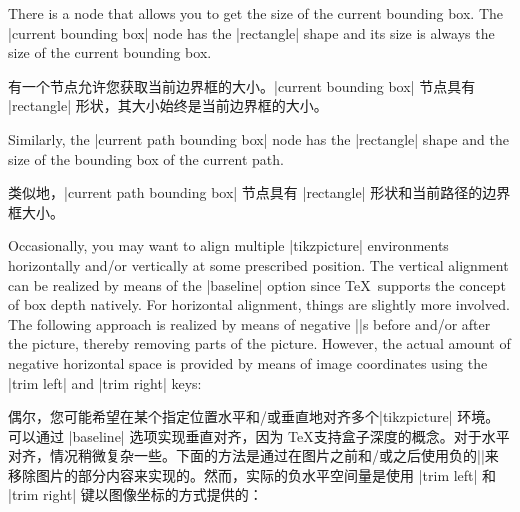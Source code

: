 There is a node that allows you to get the size of the current bounding box.
The |current bounding box| node has the |rectangle| shape and its size is
always the size of the current bounding box.

有一个节点允许您获取当前边界框的大小。|current bounding box| 节点具有 |rectangle| 形状，其大小始终是当前边界框的大小。


Similarly, the |current path bounding box| node has the |rectangle| shape and
the size of the bounding box of the current path.

类似地，|current path bounding box| 节点具有 |rectangle| 形状和当前路径的边界框大小。

\begin{codeexample}[]
\end{codeexample}

Occasionally, you may want to align multiple |tikzpicture| environments
horizontally and/or vertically at some prescribed position. The vertical
alignment can be realized by means of the |baseline| option since \TeX\
supports the concept of box depth natively. For horizontal alignment, things
are slightly more involved. The following approach is realized by means of
negative |\hspace|s before and/or after the picture, thereby removing parts of
the picture. However, the actual amount of negative horizontal space is
provided by means of image coordinates using the |trim left| and |trim right|
keys:

偶尔，您可能希望在某个指定位置水平和/或垂直地对齐多个|tikzpicture| 环境。可以通过 |baseline| 选项实现垂直对齐，因为 \TeX 支持盒子深度的概念。对于水平对齐，情况稍微复杂一些。下面的方法是通过在图片之前和/或之后使用负的|\hspace|来移除图片的部分内容来实现的。然而，实际的负水平空间量是使用 |trim left| 和 |trim right| 键以图像坐标的方式提供的：


